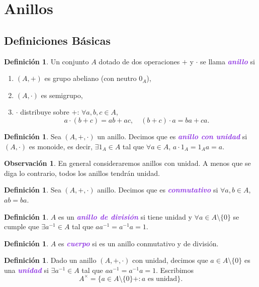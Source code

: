 \documentclass{article}
\theoremstyle{definition}
\newtheorem{definition}[theorem]{Definición}
\newtheorem*{obs}{Observación}
\theoremstyle{remark}
\numberwithin{equation}{section}
\renewcommand{\c}{\cdot}
\newcommand{\wea}[1]{\textcolor{BlueViolet}{\textbf{\emph{#1}}}}
\begin{document}
\newpage
\section{Anillos}
\subsection{Definiciones Básicas}

\begin{definition}
  Un conjunto $A$ dotado de dos operaciones $+$ y $\c$ se llama \wea{anillo} si
  \begin{enumerate}
    \item $(A,+)$ es grupo abeliano (con neutro $0_A$),
    \item $(A,\c)$ es semigrupo, %
    \item $\c$ distribuye sobre $+$: $\forall a,b,c \in A$, 
    \[ a\c (b+c) = ab + ac, \quad (b+c) \c a = ba + ca. \]
  \end{enumerate}
\end{definition}

\begin{definition}
  Sea $(A,+,\c)$ un anillo. Decimos que es \wea{anillo con unidad} si $(A,\c)$ es monoide, es decir, $\exists 1_A \in A$ tal que $\forall a \in A$, $a \c 1_A = 1_A a = a$.
\end{definition}

\begin{obs}
  En general consideraremos anillos con unidad. A menos que se diga lo contrario, todos los anillos tendrán unidad.
\end{obs}

\begin{definition}
  Sea $(A,+,\c)$ anillo. Decimos que es \wea{conmutativo} si $\forall a,b \in A$, $ab = ba$.
\end{definition}

\begin{definition}
  $A$ es un \wea{anillo de división} si tiene unidad y $\forall a \in A \setminus \{0\}$ se cumple que $\exists a^{-1} \in A$ tal que $a a^{-1} = a^{-1} a = 1$.
\end{definition}

\begin{definition}
  $A$ es \wea{cuerpo} si es un anillo conmutativo y de división.
\end{definition}

\begin{definition}
  Dado un anillo $(A,+,\c)$ con unidad, decimos que $a \in A \setminus \{0\}$ es una \wea{unidad} si $\exists a^{-1} \in A$ tal que $aa^{-1} = a^{-1} a = 1$. Escribimos 
  \[ A^\times = \{a \in A \setminus \{0\}+ \colon a \text{ es unidad}\}. \]
\end{definition}
\end{document}
